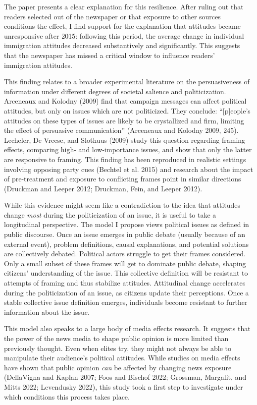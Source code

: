 \documentclass[
  12pt,
]{article}
\begin{document}
The paper presents a clear explanation for this resilience. After ruling out that readers selected out of the newspaper or that exposure to other sources conditions the effect, I find support for the explanation that attitudes became unresponsive after 2015: following this period, the average change in individual immigration attitudes decreased substantively and significantly. This suggests that the newspaper has missed a critical window to influence readers' immigration attitudes.

This finding relates to a broader experimental literature on the persuasiveness of information under different degrees of societal salience and politicization. Arceneaux and Kolodny (2009) find that campaign messages can affect political attitudes, but only on issues which are not politicized. They conclude: ``{[}p{]}eople's attitudes on these types of issues are likely to be crystallized and firm, limiting the effect of persuasive communication'' (Arceneaux and Kolodny 2009, 245). Lecheler, De Vreese, and Slothuus (2009) study this question regarding framing effects, comparing high- and low-importance issues, and show that only the latter are responsive to framing. This finding has been reproduced in realistic settings involving opposing party cues (Bechtel et al. 2015) and research about the impact of pre-treatment and exposure to conflicting frames point in similar directions (Druckman and Leeper 2012; Druckman, Fein, and Leeper 2012).

While this evidence might seem like a contradiction to the idea that attitudes change \emph{most} during the politicization of an issue, it is useful to take a longitudinal perspective. The model I propose views political issues as defined in public discourse. Once an issue emerges in public debate (usually because of an external event), problem definitions, causal explanations, and potential solutions are collectively debated. Political actors struggle to get their frames considered. Only a small subset of these frames will get to dominate public debate, shaping citizens' understanding of the issue. This collective definition will be resistant to attempts of framing and thus stabilize attitudes. Attitudinal change accelerates during the politicization of an issue, as citizens update their perceptions. Once a stable collective issue definition emerges, individuals become resistant to further information about the issue.

This model also speaks to a large body of media effects research. It suggests that the power of the news media to shape public opinion is more limited than previously thought. Even when elites try, they might not always be able to manipulate their audience's political attitudes. While studies on media effects have shown that public opinion \emph{can} be affected by changing news exposure (DellaVigna and Kaplan 2007; Foos and Bischof 2022; Grossman, Margalit, and Mitts 2022; Levendusky 2022), this study took a first step to investigate under which conditions this process takes place.
\end{document}
